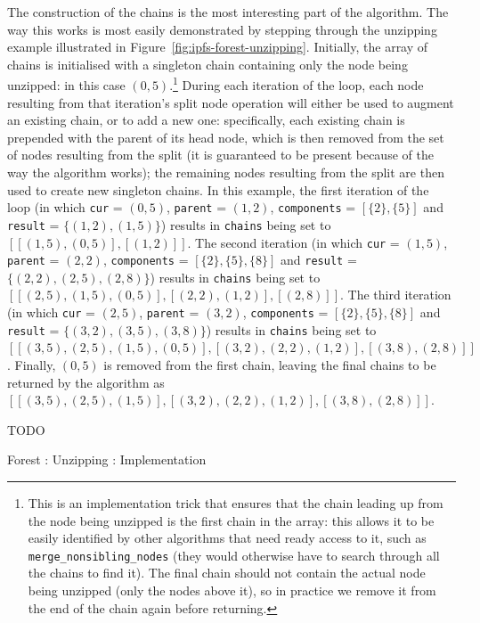 The construction of the chains is the most interesting part of the algorithm. The way this works is most easily demonstrated by stepping through the unzipping example illustrated in Figure~\ref{fig:ipfs-forest-unzipping}. Initially, the array of chains is initialised with a singleton chain containing only the node being unzipped: in this case $(0,5)$.\footnote{This is an implementation trick that ensures that the chain leading up from the node being unzipped is the first chain in the array: this allows it to be easily identified by other algorithms that need ready access to it, such as \texttt{merge_nonsibling_nodes} (they would otherwise have to search through all the chains to find it). The final chain should not contain the actual node being unzipped (only the nodes above it), so in practice we remove it from the end of the chain again before returning.} During each iteration of the loop, each node resulting from that iteration's split node operation will either be used to augment an existing chain, or to add a new one: specifically, each existing chain is prepended with the parent of its head node, which is then removed from the set of nodes resulting from the split (it is guaranteed to be present because of the way the algorithm works); the remaining nodes resulting from the split are then used to create new singleton chains. In this example, the first iteration of the loop (in which \texttt{cur} = $(0,5)$, \texttt{parent} = $(1,2)$, \texttt{components} = $[\{2\}, \{5\}]$ and \texttt{result} = $\{(1,2), (1,5)\}$) results in \texttt{chains} being set to $[[(1,5), (0,5)], [(1,2)]]$. The second iteration (in which \texttt{cur} = $(1,5)$, \texttt{parent} = $(2,2)$, \texttt{components} = $[\{2\}, \{5\}, \{8\}]$ and \texttt{result} = $\{(2,2), (2,5), (2,8)\}$) results in \texttt{chains} being set to $[[(2,5), (1,5), (0,5)], [(2,2), (1,2)], [(2,8)]]$. The third iteration (in which \texttt{cur} = $(2,5)$, \texttt{parent} = $(3,2)$, \texttt{components} = $[\{2\}, \{5\}, \{8\}]$ and \texttt{result} = $\{(3,2), (3,5), (3,8)\}$) results in \texttt{chains} being set to $[[(3,5), (2,5), (1,5), (0,5)], [(3,2), (2,2), (1,2)], [(3,8), (2,8)]]$. Finally, $(0,5)$ is removed from the first chain, leaving the final chains to be returned by the algorithm as $[[(3,5), (2,5), (1,5)], [(3,2), (2,2), (1,2)], [(3,8), (2,8)]]$.

TODO

\begin{stulisting}[p]
\caption{Forest : Unzipping : Implementation}
\label{code:ipfs-forest-unzipnode}

\end{stulisting}

